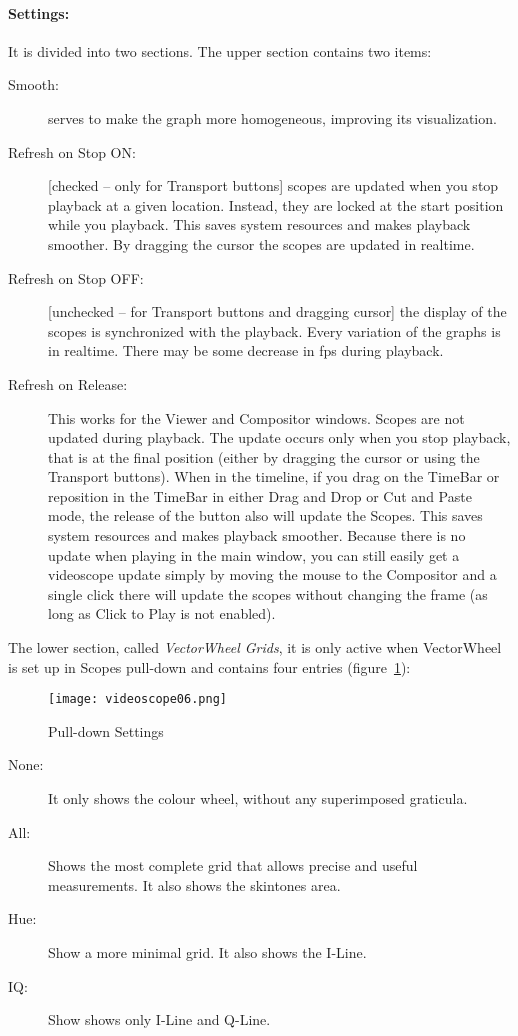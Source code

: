 \paragraph*{Settings:} It is divided into two sections. The upper section contains two items:

\begin{description}
	\item[Smooth:] serves to make the graph more homogeneous, improving its visualization.
	\item[Refresh on Stop ON:] [checked -- only for Transport buttons] scopes are updated when you stop playback at a given location. Instead, they are locked at the start position while you playback. This saves system resources and makes playback smoother. By dragging the cursor the scopes are updated in realtime.
	\item[Refresh on Stop OFF:] [unchecked -- for Transport buttons and dragging cursor] the display of the scopes is synchronized with the playback. Every variation of the graphs is in realtime. There may be some decrease in fps during playback.
	\item[Refresh on Release:] This works for the Viewer and Compositor windows. Scopes are not updated during playback. The update occurs only when you stop playback, that is at the final position (either by dragging the cursor or using the Transport buttons). When in the timeline, if you drag on the TimeBar or reposition in the TimeBar in either Drag and Drop or Cut and Paste mode, the release of the button also will update the Scopes.  This saves system resources and makes playback smoother.  Because there is no update when playing in the main window, you can still easily get a videoscope update simply by moving the mouse to the Compositor and a single click there will update the scopes without changing the frame (as long as Click to Play is not enabled).
\end{description}

 The lower section, called \textit{VectorWheel Grids}, it is only active when VectorWheel is set up in Scopes pull-down and contains four entries (figure~\ref{fig:videoscope06}):

 \begin{figure}[hbtp]
 	\centering
 	\texttt{[image: videoscope06.png]}
 	\caption{Pull-down Settings}
 	\label{fig:videoscope06}
 \end{figure}
 
 \begin{description}
 	\item[None:] It only shows the colour wheel, without any superimposed graticula.
 	\item[All:] Shows the most complete grid that allows precise and useful measurements. It also shows the skintones area.
 	\item[Hue:] Show a more minimal grid.  It also shows the I-Line.
 	\item[IQ:] Show shows only I-Line and Q-Line.
 \end{description}


